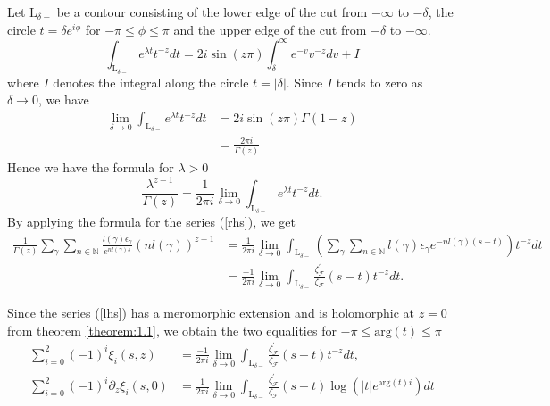 Let $\mathrm{L}_{\delta-}$ be a contour consisting of the lower edge of the cut from $-\infty$ to $-\delta$, the circle $t=\delta{e^{i\phi}}$ for $-\pi\le\phi\le\pi$ and the upper edge of the cut from $-\delta$ to $-\infty$.
\begin{equation*}
    \int_{\mathrm{L}_{\delta-}}e^{\lambda{t}}t^{-z}dt = 2i\sin(z\pi)\int_{\delta}^{\infty}e^{-v}v^{-z}dv + I
\end{equation*}
where $I$ denotes the integral along the circle $t=|\delta|$.
Since $I$ tends to zero as $\delta\rightarrow{0}$, we have
\begin{equation*}
    \begin{split}
        \lim_{\delta\rightarrow{0}}\int_{\mathrm{L}_{\delta-}}e^{\lambda{t}}t^{-z}dt 
        &= 2i\sin(z\pi)\Gamma(1-z)\\
        &= \frac{2\pi{i}}{\Gamma(z)}
    \end{split}
\end{equation*}
Hence we have the formula for $\lambda>0$
\begin{equation*}
    \frac{\lambda^{z-1}}{\Gamma(z)}=\frac{1}{2\pi{i}}\lim_{\delta\rightarrow{0}}\int_{\mathrm{L}_{\delta-}}e^{\lambda{t}}t^{-z}dt.
\end{equation*}
By applying the formula for the series (\ref{rhs}), we get
\begin{equation*}
    \begin{split}
        \frac{1}{\Gamma(z)}
        \sum_{\gamma}\sum_{n\in\mathbb{N}}
        \frac{l(\gamma)\epsilon_{\gamma}}{e^{nl(\gamma)s}}
        (nl(\gamma))^{z-1}
        &=\frac{1}{2\pi{i}}
        \lim_{\delta\rightarrow{0}}\int_{\mathrm{L}_{\delta-}}\left(\sum_{\gamma}\sum_{n\in\mathbb{N}} l(\gamma)\epsilon_{\gamma}e^{-nl(\gamma)(s-t)} \right)t^{-z}dt\\
        &=\frac{-1}{2\pi{i}}
        \lim_{\delta\rightarrow{0}}\int_{\mathrm{L}_{\delta-}}
        \frac{\zeta^{'}_{\mathcal{F}}}{\zeta_{\mathcal{F}}}(s-t)t^{-z}dt.
    \end{split}
\end{equation*}

Since the series (\ref{lhs}) has a meromorphic extension and is holomorphic at $z=0$ from theorem \ref{theorem:1.1}, we obtain the two equalities for $-\pi\le\mathrm{arg}(t)\le\pi$
\begin{equation*}
    \begin{split}
        \sum_{i=0}^{2}(-1)^{i}\xi_{i}(s,z) 
        &=\frac{-1}{2\pi{i}}
        \lim_{\delta\rightarrow{0}}\int_{\mathrm{L}_{\delta-}}\frac{\zeta^{'}_{\mathcal{F}}}{\zeta_{\mathcal{F}}}(s-t)t^{-z}dt, \\
        \sum_{i=0}^{2}(-1)^{i}\partial_{z}\xi_{i}(s,0) 
        &= \frac{1}{2\pi{i}}
        \lim_{\delta\rightarrow{0}}\int_{\mathrm{L}_{\delta-}}\frac{\zeta^{'}_{\mathcal{F}}}{\zeta_{\mathcal{F}}}(s-t)\log(|t|e^{\mathrm{arg}(t)i})dt
    \end{split}
\end{equation*}

